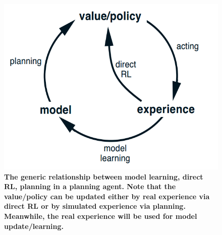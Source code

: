 \documentclass[11pt]{article}
\begin{document}
\begin{figure}
\begin{minipage}[t]{1\linewidth}
  \centering
  \centerline{\includegraphics[scale = 0.3]{Planning_learning_relationship.png}}
\end{minipage}
\caption{\footnotesize{\textbf{The generic relationship between model learning, direct RL, planning in a planning agent. Note that the value/policy can be updated either by real experience via direct RL or by simulated experience via planning. Meanwhile, the real experience will be used for model update/learning. }}}
\label{fig: Planning_learning_relationship}
\end{figure}
\end{document}
